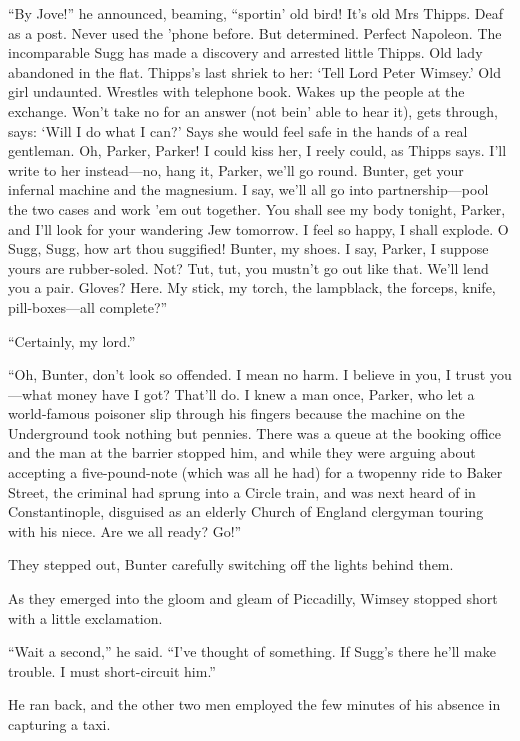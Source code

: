 \enquote{By Jove!} he announced, beaming, \enquote{sportin’ old bird! It’s old Mrs Thipps. Deaf as a post. Never used the ’phone before. But determined. Perfect Napoleon. The incomparable Sugg has made a discovery and arrested little Thipps. Old lady abandoned in the flat. Thipps’s last shriek to her: \enquote{Tell Lord Peter Wimsey.} Old girl undaunted. Wrestles with telephone book. Wakes up the people at the exchange. Won’t take no for an answer (not bein’ able to hear it), gets through, says: ‘Will I do what I can?’ Says she would feel safe in the hands of a real gentleman. Oh, Parker, Parker! I could kiss her, I reely could, as Thipps says. I’ll write to her instead\allowbreak---\allowbreak no, hang it, Parker, we’ll go round. Bunter, get your infernal machine and the magnesium. I say, we’ll all go into partnership\allowbreak---\allowbreak pool the two cases and work ’em out together. You shall see my body tonight, Parker, and I’ll look for your wandering Jew tomorrow. I feel so happy, I shall explode. O Sugg, Sugg, how art thou suggified! Bunter, my shoes. I say, Parker, I suppose yours are rubber-soled. Not? Tut, tut, you mustn’t go out like that. We’ll lend you a pair. Gloves? Here. My stick, my torch, the lampblack, the forceps, knife, pill-boxes\allowbreak---\allowbreak all complete?}

\enquote{Certainly, my lord.}

\enquote{Oh, Bunter, don’t look so offended. I mean no harm. I believe in you, I trust you\allowbreak---\allowbreak what money have I got? That’ll do. I knew a man once, Parker, who let a world-famous poisoner slip through his fingers because the machine on the Underground took nothing but pennies. There was a queue at the booking office and the man at the barrier stopped him, and while they were arguing about accepting a five-pound-note (which was all he had) for a twopenny ride to Baker Street, the criminal had sprung into a Circle train, and was next heard of in Constantinople, disguised as an elderly Church of England clergyman touring with his niece. Are we all ready? Go!}

They stepped out, Bunter carefully switching off the lights behind them.

As they emerged into the gloom and gleam of Piccadilly, Wimsey stopped short with a little exclamation.

\enquote{Wait a second,} he said. \enquote{I’ve thought of something. If Sugg’s there he’ll make trouble. I must short-circuit him.}

He ran back, and the other two men employed the few minutes of his absence in capturing a taxi.

